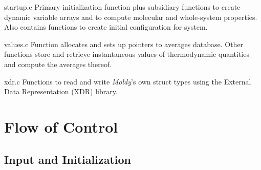 \documentclass[a4paper,twoside]{report}
\newcommand{\moldy}{\emph{Moldy}}
\begin{document}
\begin{Fndescription}
\item[startup.c] Primary initialization function 
  plus subsidiary functions  to create
  dynamic variable arrays and  to compute
  molecular and whole-system properties.  Also contains functions to
  create initial configuration for system.
\item[values.c] Function  allocates and sets
  up pointers to averages database.  Other functions store and
  retrieve instantaneous values of thermodynamic quantities and
  compute the averages thereof.
\item[xdr.c] Functions to read and write \moldy's own struct types
  using the External Data Representation (XDR) library.
\end{Fndescription}

\section{Flow of Control}%
\subsection{Input and Initialization}
\label{sec:startup}
\end{document}
